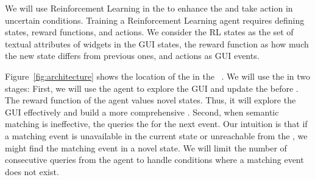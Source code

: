 \bigskip
We will use Reinforcement Learning in the \testreuse to enhance the \tam and take action in uncertain conditions.
Training a Reinforcement Learning agent requires defining  states, reward functions, and actions.
We consider the RL states as the set of textual attributes of widgets in the GUI states, the reward function as how much the new state differs from previous ones, and actions as GUI events.

\bigskip
Figure~\ref{fig:architecture} shows the location of the \rlaganet in the \testreuse~\architecture.
We will use the \rlaganet in two stages: 
First, we will use the agent to explore the GUI and update the \tam before \testreuse.
The reward function of the agent values novel states. Thus,  it will explore the GUI effectively and build a more comprehensive \tam.
Second, when semantic matching is ineffective, the \selector queries the \rlaganet for the next event.
Our intuition is that if a matching event is unavailable in the current state or unreachable from the \tam, we might find the matching event in a novel state.
We will limit the number of consecutive queries from the agent to handle conditions where a matching event does not exist.


